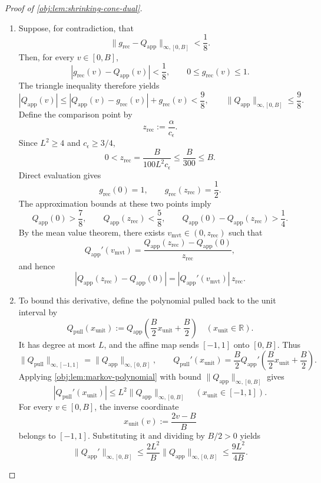 \documentclass[11pt]{article}
\begin{document}
\begin{proof}[Proof of \cref{obj:lem:shrinking-cone-dual}]
\begin{enumerate}
\item Suppose, for contradiction, that
\[
\|g_{\mathrm{rec}}-Q_{\mathrm{app}}\|_{\infty,[0,B]}<\frac18.
\]
Then, for every \(v\in[0,B]\),
\[
|g_{\mathrm{rec}}(v)-Q_{\mathrm{app}}(v)|<\frac18,
\qquad
0\le g_{\mathrm{rec}}(v)\le1.
\]
The triangle inequality therefore yields
\[
|Q_{\mathrm{app}}(v)|
\le
|Q_{\mathrm{app}}(v)-g_{\mathrm{rec}}(v)|
+g_{\mathrm{rec}}(v)
<\frac98,
\qquad
\|Q_{\mathrm{app}}\|_{\infty,[0,B]}\le\frac98.
\]
Define the comparison point by
\[
z_{\mathrm{rec}}:=\frac{\alpha}{c_\epsilon}.
\]
Since \(L^2\ge4\) and \(c_\epsilon\ge3/4\),
\[
0<z_{\mathrm{rec}}
=
\frac{B}{100L^2c_\epsilon}
\le\frac{B}{300}\le B.
\]
Direct evaluation gives
\[
g_{\mathrm{rec}}(0)=1,
\qquad
g_{\mathrm{rec}}(z_{\mathrm{rec}})=\frac12.
\]
The approximation bounds at these two points imply
\[
Q_{\mathrm{app}}(0)>\frac78,
\qquad
Q_{\mathrm{app}}(z_{\mathrm{rec}})<\frac58,
\qquad
Q_{\mathrm{app}}(0)-Q_{\mathrm{app}}(z_{\mathrm{rec}})>\frac14.
\]
By the mean value theorem, there exists \(v_{\mathrm{mvt}}\in(0,z_{\mathrm{rec}})\) such that
\[
Q_{\mathrm{app}}'(v_{\mathrm{mvt}})
=
\frac{Q_{\mathrm{app}}(z_{\mathrm{rec}})-Q_{\mathrm{app}}(0)}
{z_{\mathrm{rec}}},
\]
and hence
\[
|Q_{\mathrm{app}}(z_{\mathrm{rec}})-Q_{\mathrm{app}}(0)|
=
|Q_{\mathrm{app}}'(v_{\mathrm{mvt}})|\,z_{\mathrm{rec}}.
\]

\item To bound this derivative, define the polynomial pulled back to the unit interval by
\[
Q_{\mathrm{pull}}(x_{\mathrm{unit}})
:=
Q_{\mathrm{app}}\!\left(\frac B2x_{\mathrm{unit}}+\frac B2\right)
\quad (x_{\mathrm{unit}}\in\mathbb R).
\]
It has degree at most \(L\), and the affine map sends \([-1,1]\) onto \([0,B]\). Thus
\[
\|Q_{\mathrm{pull}}\|_{\infty,[-1,1]}
=
\|Q_{\mathrm{app}}\|_{\infty,[0,B]},
\qquad
Q_{\mathrm{pull}}'(x_{\mathrm{unit}})
=
\frac B2
Q_{\mathrm{app}}'\!\left(\frac B2x_{\mathrm{unit}}+\frac B2\right).
\]
Applying \cref{obj:lem:markov-polynomial} with bound
\(\|Q_{\mathrm{app}}\|_{\infty,[0,B]}\) gives
\[
|Q_{\mathrm{pull}}'(x_{\mathrm{unit}})|
\le
L^2\|Q_{\mathrm{app}}\|_{\infty,[0,B]}
\quad (x_{\mathrm{unit}}\in[-1,1]).
\]
For every \(v\in[0,B]\), the inverse coordinate
\[
x_{\mathrm{unit}}(v):=\frac{2v-B}{B}
\]
belongs to \([-1,1]\). Substituting it and dividing by \(B/2>0\) yields
\[
\|Q_{\mathrm{app}}'\|_{\infty,[0,B]}
\le
\frac{2L^2}{B}\|Q_{\mathrm{app}}\|_{\infty,[0,B]}
\le
\frac{9L^2}{4B}.
\]


\end{enumerate}
\end{proof}
\end{document}
